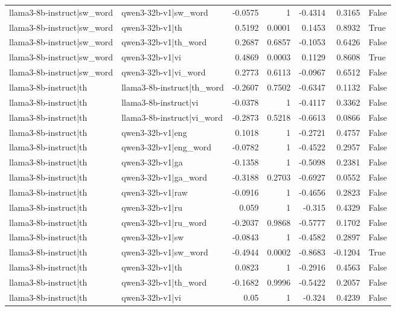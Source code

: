 \begin{table}
\begin{tabular}{l l r r r r l}
llama3-8b-instruct|sw_word & qwen3-32b-v1|sw_word & -0.0575 & 1 & -0.4314 & 0.3165 & False \\
llama3-8b-instruct|sw_word & qwen3-32b-v1|th & 0.5192 & 0.0001 & 0.1453 & 0.8932 & True \\
llama3-8b-instruct|sw_word & qwen3-32b-v1|th_word & 0.2687 & 0.6857 & -0.1053 & 0.6426 & False \\
llama3-8b-instruct|sw_word & qwen3-32b-v1|vi & 0.4869 & 0.0003 & 0.1129 & 0.8608 & True \\
llama3-8b-instruct|sw_word & qwen3-32b-v1|vi_word & 0.2773 & 0.6113 & -0.0967 & 0.6512 & False \\
llama3-8b-instruct|th & llama3-8b-instruct|th_word & -0.2607 & 0.7502 & -0.6347 & 0.1132 & False \\
llama3-8b-instruct|th & llama3-8b-instruct|vi & -0.0378 & 1 & -0.4117 & 0.3362 & False \\
llama3-8b-instruct|th & llama3-8b-instruct|vi_word & -0.2873 & 0.5218 & -0.6613 & 0.0866 & False \\
llama3-8b-instruct|th & qwen3-32b-v1|eng & 0.1018 & 1 & -0.2721 & 0.4757 & False \\
llama3-8b-instruct|th & qwen3-32b-v1|eng_word & -0.0782 & 1 & -0.4522 & 0.2957 & False \\
llama3-8b-instruct|th & qwen3-32b-v1|ga & -0.1358 & 1 & -0.5098 & 0.2381 & False \\
llama3-8b-instruct|th & qwen3-32b-v1|ga_word & -0.3188 & 0.2703 & -0.6927 & 0.0552 & False \\
llama3-8b-instruct|th & qwen3-32b-v1|raw & -0.0916 & 1 & -0.4656 & 0.2823 & False \\
llama3-8b-instruct|th & qwen3-32b-v1|ru & 0.059 & 1 & -0.315 & 0.4329 & False \\
llama3-8b-instruct|th & qwen3-32b-v1|ru_word & -0.2037 & 0.9868 & -0.5777 & 0.1702 & False \\
llama3-8b-instruct|th & qwen3-32b-v1|sw & -0.0843 & 1 & -0.4582 & 0.2897 & False \\
llama3-8b-instruct|th & qwen3-32b-v1|sw_word & -0.4944 & 0.0002 & -0.8683 & -0.1204 & True \\
llama3-8b-instruct|th & qwen3-32b-v1|th & 0.0823 & 1 & -0.2916 & 0.4563 & False \\
llama3-8b-instruct|th & qwen3-32b-v1|th_word & -0.1682 & 0.9996 & -0.5422 & 0.2057 & False \\
llama3-8b-instruct|th & qwen3-32b-v1|vi & 0.05 & 1 & -0.324 & 0.4239 & False \\

\end{tabular}
\end{table}
